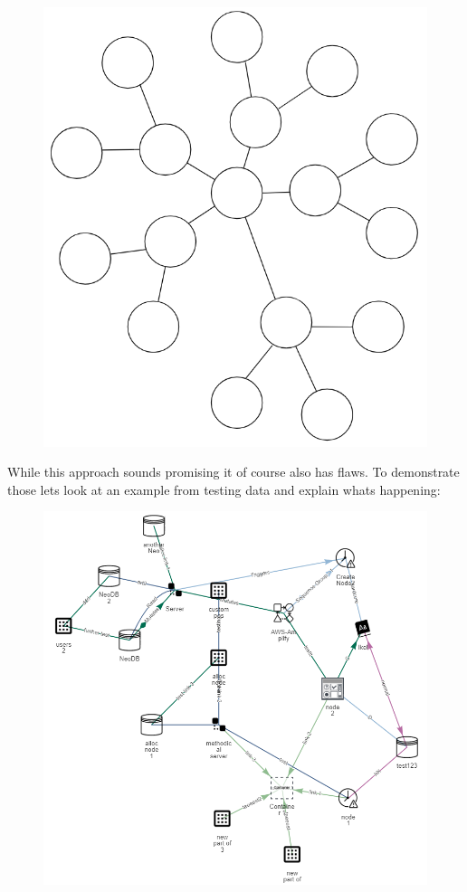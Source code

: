 \begin{figure}[H]
\label{ex:TreeBad}
\centering
\includegraphics[scale=.4]{Bilder/FlowerDistEx.png}
\end{figure}

While this approach sounds promising it of course also has flaws. To demonstrate those lets look at an example from testing data and explain whats happening:

\begin{figure}[H]
\label{ex:TreeBad}
\centering
\includegraphics[scale=.55]{Bilder/FlowerExBad.png}
\end{figure}

